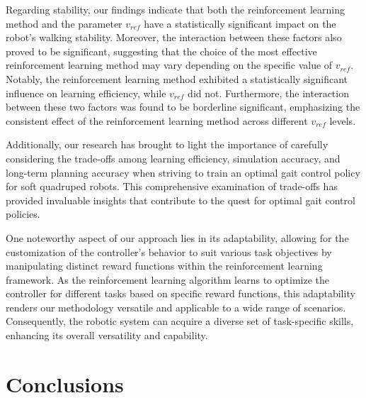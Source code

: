 Regarding stability, our findings indicate that both the reinforcement learning method and the parameter $v_{ref}$ have a statistically significant impact on the robot's walking stability. Moreover, the interaction between these factors also proved to be significant, suggesting that the choice of the most effective reinforcement learning method may vary depending on the specific value of $v_{ref}$. Notably, the reinforcement learning method exhibited a statistically significant influence on learning efficiency, while $v_{ref}$ did not. Furthermore, the interaction between these two factors was found to be borderline significant, emphasizing the consistent effect of the reinforcement learning method across different $v_{ref}$ levels.

Additionally, our research has brought to light the importance of carefully considering the trade-offs among learning efficiency, simulation accuracy, and long-term planning accuracy when striving to train an optimal gait control policy for soft quadruped robots. This comprehensive examination of trade-offs has provided invaluable insights that contribute to the quest for optimal gait control policies.

One noteworthy aspect of our approach lies in its adaptability, allowing for the customization of the controller's behavior to suit various task objectives by manipulating distinct reward functions within the reinforcement learning framework. As the reinforcement learning algorithm learns to optimize the controller for different tasks based on specific reward functions, this adaptability renders our methodology versatile and applicable to a wide range of scenarios. Consequently, the robotic system can acquire a diverse set of task-specific skills, enhancing its overall versatility and capability.

\section{Conclusions}
